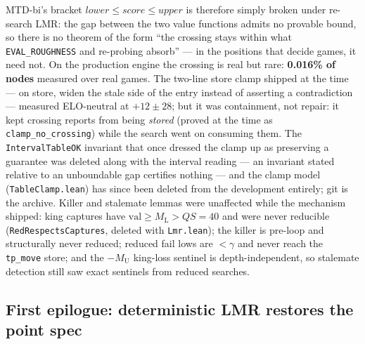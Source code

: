 \documentclass[11pt]{article}
\newcommand{\MU}{M_{\mathrm{U}}}    %
\newcommand{\ML}{M_{\mathrm{L}}}    %
\theoremstyle{plain}
\theoremstyle{definition}
\theoremstyle{remark}
\begin{document}
MTD-bi's bracket $\mathit{lower} \le \mathit{score} \le \mathit{upper}$
is therefore simply broken under re-search LMR: the gap between the two
value functions admits no provable bound, so there is no theorem of the
form ``the crossing stays within what \texttt{EVAL\_ROUGHNESS} and
re-probing absorb'' --- in the positions that decide games, it need
not.  On the production engine the crossing is real but rare:
\textbf{0.016\% of nodes} measured over real games.  The two-line
store clamp shipped at the time --- on store, widen the stale side of
the entry instead of asserting a contradiction --- measured
ELO-neutral at $+12 \pm 28$; but it was containment, not repair: it
kept crossing reports from being \emph{stored} (proved at the time as
\texttt{clamp\_no\_crossing}) while the search went on consuming them.
The \texttt{IntervalTableOK} invariant that once dressed the clamp up
as preserving a guarantee was deleted along with the interval reading
--- an invariant stated relative to an unboundable gap certifies
nothing --- and the clamp model (\texttt{TableClamp.lean}) has since
been deleted from the development entirely; git is the archive.
Killer and
stalemate lemmas were unaffected while the mechanism shipped: king
captures have
$\mathrm{val} \ge \ML > \mathit{QS} = 40$ and were never reducible
(\texttt{RedRespectsCaptures}, deleted with \texttt{Lmr.lean}); the
killer is pre-loop and
structurally never reduced; reduced fail lows are $< \gamma$ and never
reach the \texttt{tp\_move} store; and the $-\MU$ king-loss sentinel is
depth-independent, so stalemate detection still saw exact sentinels
from reduced searches.

\subsection{First epilogue: deterministic LMR restores the point
spec}
\label{sec:lmrdet}
\end{document}
